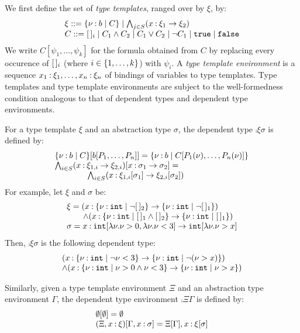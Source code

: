 We first define the set of \emph{type templates}, ranged over by \(\xi\), by:
\[
\begin{array}{l}
\xi ::= \{\nu\mathbin{:} b \mid C\} \mid \bigwedge_{j\in S} (x\mathbin{:}\xi_1\rightarrow \xi_2)\\
C ::= [\,]_i \mid C_1\land C_2 \mid C_1\lor C_2 \mid \neg C_1 \mid \mathtt{true} \mid \mathtt{false}
\end{array}
\]
We write \(C[\psi_1,\ldots,\psi_k]\) for the formula obtained from \(C\) by replacing 
every occurence of \([\,]_i\)  (where \(i\in\{1,\ldots,k\}\)) with \(\psi_i\).
A \emph{type template environment} is a sequence \(x_1\mathbin{:}\xi_1,\ldots,x_n\mathbin{:}\xi_n\)
of bindings of variables to type templates. Type templates and type template environments
are subject to the well-formedness condition analogous to that of dependent types
and dependent type environments. 

For a type template \(\xi\) and an abstraction type \(\sigma\), 
the dependent type \(\comp{\xi}{\sigma}\) is defined by:
\[
\begin{array}{l}
\{\nu\mathbin{:} b \mid C\}[b[P_1,\ldots,P_n]] = \{\nu\mathbin{:} b \mid C[P_1(\nu),\ldots,P_n(\nu)]\}\\
\bigwedge_{i\in S}(x\mathbin{:}\xi_{1,i}\rightarrow \xi_{2,i})[x\mathbin{:}\sigma_1\rightarrow \sigma_2] =\\
\qquad\qquad    \bigwedge_{i\in S}(x\mathbin{:} \xi_{1,i}[\sigma_1] \rightarrow \xi_{2,i}[\sigma_2])
\end{array}
\]
For example, let \(\xi\) and \(\sigma\) be:
\[
\begin{array}{l}
\xi = (x\mathbin{:}\{\nu\mathbin{:} \mathtt{int}\mid \neg [\,]_2\}\rightarrow \{\nu\mathbin{:} \mathtt{int}\mid \neg[\,]_1\})\\
\qquad  \land (x\mathbin{:}\{\nu\mathbin{:} \mathtt{int}\mid [\,]_1\land [\,]_2\}\rightarrow \{\nu\mathbin{:} \mathtt{int}\mid [\,]_1\})\\
\sigma = x\mathbin{:}\mathtt{int}[\lambda \nu.\nu>0, \lambda \nu.\nu<3]\rightarrow \mathtt{int}[\lambda \nu.\nu>x]
\end{array}
\]
Then, \(\comp{\xi}{\sigma}\) is the following dependent type:
\[
\begin{array}{l}
(x\mathbin{:}\{\nu\mathbin{:} \mathtt{int}\mid \neg \nu<3\}\rightarrow \{\nu\mathbin{:} \mathtt{int}\mid \neg(\nu>x)\})\\
  \land (x\mathbin{:}\{\nu\mathbin{:} \mathtt{int}\mid \nu>0\land \nu<3\}\rightarrow \{\nu\mathbin{:} \mathtt{int}\mid \nu>x\})
\end{array}
\]

Similarly, given a type template environment \(\Xi\) and an abstraction type environment \(\Gamma\),
the dependent type environment \(\comp{\Xi}{\Gamma}\) is defined by:
\[
\begin{array}{l}
\emptyset[\emptyset] = \emptyset\\
(\Xi,x\mathbin{:}\xi)[\Gamma,x\mathbin{:}\sigma] = \Xi[\Gamma], x\mathbin{:} \xi[\sigma]
\end{array}
\]

